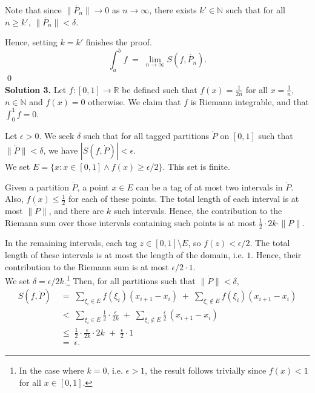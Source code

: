 \documentclass[10pt]{article}
\begin{document}
        Note that since $\|\dot{P_n}\| \to 0$ as $n \to \infty$, there exists $k' \in \mathbb{N}$ such that for all $n \ge k'$,
        $\|\dot{P_n}\| < \delta$.

        Hence, setting $k = k'$ finishes the proof.
        \[\int_a^b f \;=\; \lim_{n \to \infty} S(f, \dot{P_n}).\] \qed\\

        \textbf{Solution 3.}
        Let $f\colon [0, 1] \to \mathbb{R}$ be defined such that $f(x) = \frac{1}{2n}$ for all $x = \frac{1}{n}$, $n \in \mathbb{N}$ and
        $f(x) = 0$ otherwise. We claim that $f$ is Riemann integrable, and that $\int_0^1 f = 0$.

        Let $\epsilon > 0$. We seek $\delta$ such that for all tagged partitions $\dot{P}$ on $[0, 1]$ such that $\|\dot{P}\| < \delta$,
        we have $|S(f, \dot{P})| < \epsilon$. \\

        We set $E = \{x : x \in [0, 1] \land f(x) \ge \epsilon/2\}$. This set is finite.

        Given a partition $\dot{P}$, a point $x \in E$ can
        be a tag of at most two intervals in $\dot{P}$. Also, $f(x) \le \frac{1}{2}$ for each of these points.
        The total length of each interval is at most $\|\dot{P}\|$, and there are $k$ such intervals.
        Hence, the contribution to the Riemann sum over those intervals containing such points is at most $\frac{1}{2}\cdot 2k\cdot \|\dot{P}\|$.
        
        In the remaining intervals, each tag $z \in [0, 1]\setminus E$, so $f(z) < \epsilon/2$. The total length of these intervals
        is at most the length of the domain, i.e. $1$. Hence, their contribution to the Riemann sum is at most $\epsilon/2 \cdot 1$.\\
        
        We set $\delta = \epsilon/2k$.\footnote{In the case where $k = 0$, i.e. $\epsilon > 1$, the result follows trivially since $f(x) < 1$ for all 
        $x \in [0, 1]$.}
        Then, for all partitions such that $\|\dot{P}\| < \delta$,
        \begin{align*}
                S(f, \dot{P}) \;&=\; \sum_{\xi_i \in E} f(\xi_i)(x_{i + 1} - x_i) \;+\; \sum_{\xi_i \notin E} f(\xi_i)(x_{i + 1} - x_i) \\
                        \;&<\; \sum_{\xi_i \in E} \frac{1}{2}\cdot \frac{\epsilon}{2k} \;+\; \sum_{\xi_i \notin E} \frac{\epsilon}{2} \,(x_{i + 1} - x_i) \\
                        \;&\le\; \frac{1}{2}\cdot \frac{\epsilon}{2k}\cdot 2k \;+\; \frac{\epsilon}{2} \cdot 1 \\
                        \;&=\; \epsilon.
        \end{align*}
\end{document}
